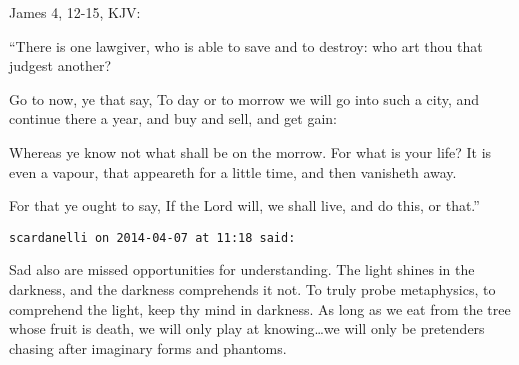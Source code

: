\begin{footnotesize}
\begin{sffamily}
James 4, 12-15, KJV:

“There is one lawgiver, who is able to save and to destroy: who art thou that judgest another?

Go to now, ye that say, To day or to morrow we will go into such a city, and continue there a year, and buy and sell, and get gain:

Whereas ye know not what shall be on the morrow. For what is your life? It is even a vapour, that appeareth for a little time, and then vanisheth away.

For that ye ought to say, If the Lord will, we shall live, and do this, or that.”


\hfill

\texttt{scardanelli on 2014-04-07 at 11:18 said: }

Sad also are missed opportunities for understanding. The light shines in the darkness, and the darkness comprehends it not. To truly probe metaphysics, to comprehend the light, keep thy mind in darkness. As long as we eat from the tree whose fruit is death, we will only play at knowing…we will only be pretenders chasing after imaginary forms and phantoms.


\hfill


\end{sffamily}\end{footnotesize}
